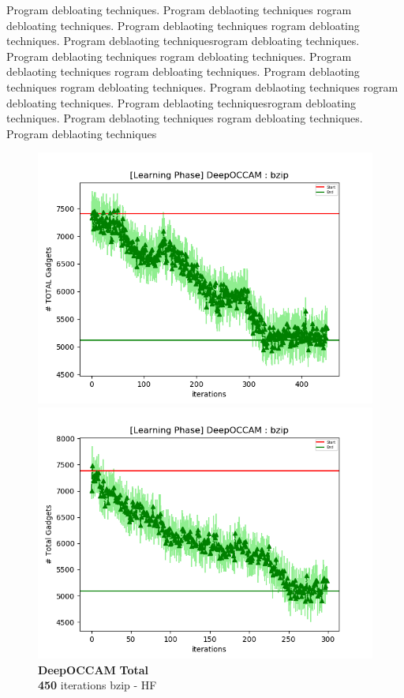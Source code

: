 \documentclass{relatorio}
\begin{document}
Program debloating techniques. Program deblaoting techniques rogram debloating techniques. Program deblaoting techniques
rogram debloating techniques. Program deblaoting techniquesrogram debloating techniques. Program deblaoting techniques
rogram debloating techniques. Program deblaoting techniques rogram debloating techniques. Program deblaoting techniques
rogram debloating techniques. Program deblaoting techniques 
rogram debloating techniques. Program deblaoting techniquesrogram debloating techniques. Program deblaoting techniques
rogram debloating techniques. Program deblaoting techniques
	\begin{figure}[H]
	\centering
	\captionsetup{justification=centering}
	\includegraphics[width=1\linewidth]{imgs/deepoccam_HF_learning_bzip_TOTAL_plot.png}
	\caption{\textbf{DeepOCCAM} \textbf{Total} \\ \textbf{450} iterations \color{blue} bzip - HF}%
	\label{fig:plant}
	\centering
	\captionsetup{justification=centering}
	\includegraphics[width=1\linewidth]{imgs/deepoccam_inst2vec_bzip_Total_plot.png}

\end{figure}
\end{document}
